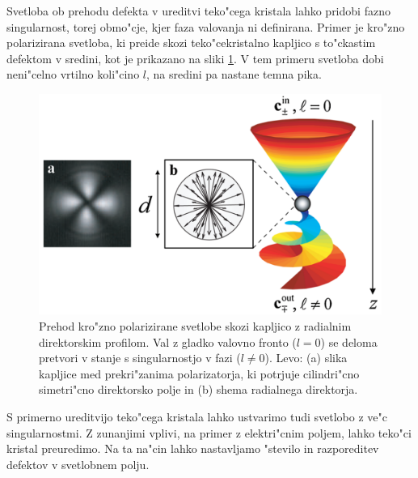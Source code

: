 \documentclass[12pt,twoside,openright,final]{report}
\begin{document}
Svetloba ob prehodu defekta v ureditvi teko"cega kristala lahko pridobi fazno singularnost, torej obmo"cje, kjer faza valovanja ni definirana. 
Primer je kro"zno polarizirana svetloba, ki preide skozi teko"cekristalno kapljico s to"ckastim defektom v sredini, kot je prikazano na sliki \ref{fig:defekt-kapljica}. 
V tem primeru svetloba dobi neni"celno vrtilno koli"cino $l$, na sredini pa nastane temna pika\cite{brasselet-droplet}. 

\begin{figure}[!htbp]
 \centering
 \includegraphics[width=.8\textwidth]{defekt-kapljica}
 \caption{Prehod kro"zno polarizirane svetlobe skozi kapljico z radialnim direktorskim profilom. Val z gladko valovno fronto ($l=0$) se deloma pretvori v stanje s singularnostjo v fazi ($l\neq 0$)\cite{brasselet-droplet}. Levo: (a) slika kapljice med prekri"zanima polarizatorja, ki potrjuje cilindri"cno simetri"cno direktorsko polje in (b) shema radialnega direktorja. }
 \label{fig:defekt-kapljica}
\end{figure}

S primerno ureditvijo teko"cega kristala lahko ustvarimo tudi svetlobo z ve"c singularnostmi. 
Z zunanjimi vplivi, na primer z elektri"cnim poljem, lahko teko"ci kristal preuredimo. 
Na ta na"cin lahko nastavljamo "stevilo in razporeditev defektov v svetlobnem polju\cite{brasselet-arrays}.
\end{document}
